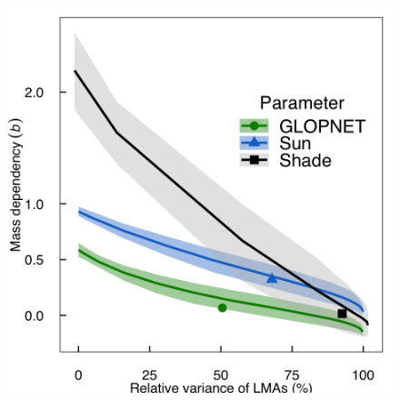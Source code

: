 \documentclass[
  12pt,
  a4paper,
,tablecaptionabove
]{scrartcl}
\providecommand{\DIFaddbeginFL}{} %
\providecommand{\DIFdelbeginFL}{} %
\providecommand{\DIFdelendFL}{} %
\newcommand{\DIFscaledelfig}{0.5}
\newlength{\DIFdelgraphicswidth} %
\newlength{\DIFdelgraphicsheight} %
\newcommand{\DIFaddincludegraphics}[2][]{{\color{blue}\fbox{\DIFOincludegraphics[#1]{#2}}}} %
\newcommand{\DIFdelincludegraphics}[2][]{%
\sbox{\DIFdelgraphicsbox}{\DIFOincludegraphics[#1]{#2}}%
\settoboxwidth{\DIFdelgraphicswidth}{\DIFdelgraphicsbox} %
\settoboxtotalheight{\DIFdelgraphicsheight}{\DIFdelgraphicsbox} %
\scalebox{\DIFscaledelfig}{%
\parbox[b]{\DIFdelgraphicswidth}{\usebox{\DIFdelgraphicsbox}\\[-\baselineskip] \rule{\DIFdelgraphicswidth}{0em}}\llap{\resizebox{\DIFdelgraphicswidth}{\DIFdelgraphicsheight}{%
\setlength{\unitlength}{\DIFdelgraphicswidth}%
\begin{picture}(1,1)%
\thicklines\linethickness{2pt} %
{\color[rgb]{1,0,0}\put(0,0){\framebox(1,1){}}}%
{\color[rgb]{1,0,0}\put(0,0){\line( 1,1){1}}}%
{\color[rgb]{1,0,0}\put(0,1){\line(1,-1){1}}}%
\end{picture}%
}\hspace*{3pt}}} %
} %
\DeclareRobustCommand{\DIFaddbeginFL}{\DIFOaddbeginFL \let\includegraphics\DIFaddincludegraphics} %
\DeclareRobustCommand{\DIFdelbeginFL}{\DIFOdelbeginFL \let\includegraphics\DIFdelincludegraphics} %
\DeclareRobustCommand{\DIFdelendFL}{\DIFOaddendFL \let\includegraphics\DIFOincludegraphics} %
\begin{document}
\begin{figure}
\DIFdelbeginFL %
\DIFdelendFL \DIFaddbeginFL \hypertarget{fig:massplt}{%
\centering
\includegraphics{../figs/mass_prop_simple.png}
}
\end{figure}
\end{document}

